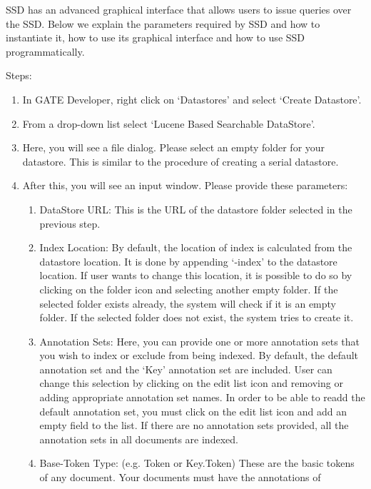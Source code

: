 SSD has an advanced graphical interface that allows users to issue
queries over the SSD.  Below we explain the parameters required by SSD
and how to instantiate it, how to use its graphical interface and how
to use SSD programmatically.


Steps:
\begin{enumerate}
\item In GATE Developer, right click on `Datastores' and select `Create Datastore'.
\item From a drop-down list select `Lucene Based Searchable DataStore'.
\item Here, you will see a file dialog. Please select an empty folder for your
datastore. This is similar to the procedure of creating a serial datastore.
\item After this, you will see an input window. Please provide these parameters:
\begin{enumerate}
\item DataStore URL:  This is the URL of the datastore folder selected in the 
previous step.
\item Index Location:  By default, the location of index is calculated from the 
datastore location. It is done by appending `-index' to the datastore location.
If user wants to change this location, it is possible to do so by clicking on 
the folder icon and selecting another empty folder.  If the selected folder
exists already, the system will check if it is an empty folder. If the selected 
folder does not exist, the system tries to create it.
\item Annotation Sets:  Here, you can provide one or more annotation sets that
you wish to index or exclude from being indexed. By default, the default 
annotation set and the `Key' annotation set are included.  User can change this 
selection by clicking on the edit list icon and removing or adding appropriate 
annotation set names.  In order to be able to readd the default annotation set, 
you must click on the edit list icon and add an empty field to the list. If 
there are no annotation sets provided, all the annotation sets in all documents 
are indexed.
\item Base-Token Type:  (e.g. Token or Key.Token)  These are the basic tokens of
any document.  Your documents must have the annotations of

\end{enumerate}
\end{enumerate}
